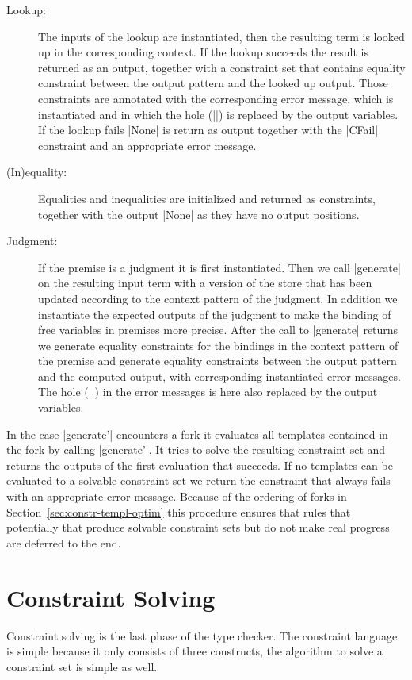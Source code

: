 \begin{description}
\item[Lookup:] The inputs of the lookup are instantiated, then the
  resulting term is looked up in the corresponding context. If the
  lookup succeeds the result is returned as an output, together with a
  constraint set that contains equality constraint between the output
  pattern and the looked up output. Those constraints are annotated
  with the corresponding error message, which is instantiated and in
  which the hole (\code|{}|) is replaced by the output variables. If
  the lookup fails \code|None| is return as output together with the
  \code|CFail| constraint and an appropriate error message.
\item[(In)equality:] Equalities and inequalities are initialized and
  returned as constraints, together with the output \code|None| as
  they have no output positions.
\item[Judgment:] If the premise is a judgment it is first
  instantiated. Then we call \code|generate| on the resulting input
  term with a version of the store that has been updated according to
  the context pattern of the judgment. In addition we instantiate the
  expected outputs of the judgment to make the binding of free
  variables in premises more precise. After the call to
  \code|generate| returns we generate equality constraints for the
  bindings in the context pattern of the premise and generate equality
  constraints between the output pattern and the computed output, with
  corresponding instantiated error messages. 
  The hole (\code|{}|) in the error messages is here also replaced by
  the output variables.
\end{description}

In the case \code|generate'| encounters a fork it evaluates all
templates contained in the fork by calling \code|generate'|. It tries
to solve the resulting constraint set and returns the outputs of the
first evaluation that succeeds. If no templates can be evaluated to a
solvable constraint set we return the constraint that always fails
with an appropriate error message. Because of the ordering of forks in
Section~\ref{sec:constr-templ-optim} this procedure ensures that rules
that potentially that produce solvable constraint sets but do not make
real progress are deferred to the end.

\section{Constraint Solving}
\label{sec:constraint-solving}
Constraint solving is the last phase of the type checker. The
constraint language is simple because it only consists of three
constructs, the algorithm to solve a constraint set is simple as well.

